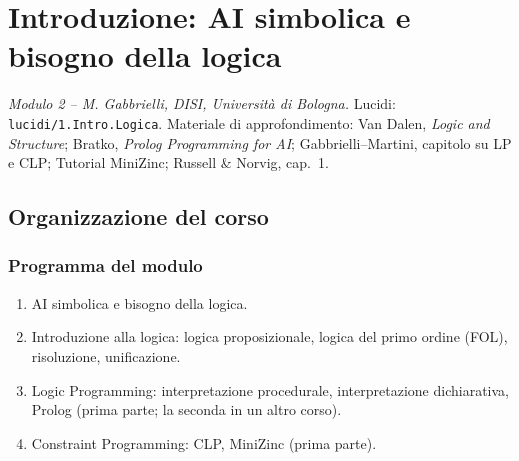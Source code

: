 \chapter{Introduzione: AI simbolica e bisogno della logica}

\textit{Modulo 2 -- M. Gabbrielli, DISI, Università di Bologna.}
Lucidi: \texttt{lucidi/1.Intro.Logica}. Materiale di approfondimento:
Van Dalen, \emph{Logic and Structure}; Bratko, \emph{Prolog Programming for AI};
Gabbrielli--Martini, capitolo su LP e CLP; Tutorial MiniZinc;
Russell \& Norvig, cap.~1.

\section{Organizzazione del corso}


\subsection{Programma del modulo}
\begin{enumerate}
  \item AI simbolica e bisogno della logica.
  \item Introduzione alla logica: logica proposizionale, logica del primo
        ordine (FOL), risoluzione, unificazione.
  \item Logic Programming: interpretazione procedurale, interpretazione
        dichiarativa, Prolog (prima parte; la seconda in un altro corso).
  \item Constraint Programming: CLP, MiniZinc (prima parte).
\end{enumerate}

